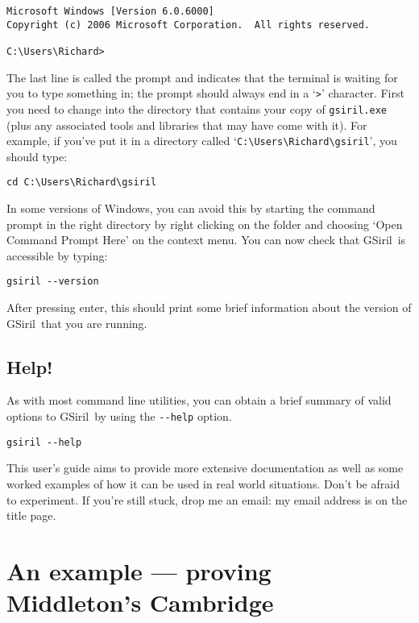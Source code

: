 \documentclass[a4paper,11pt,oneside]{book}
\makeatletter
\newcommand{\oi}[1]{\index{#1@{\hspace*{-\optwidth}\texttt{-}\texttt{#1}}}}
\newcommand{\loi}[1]{\index{#1@{\hspace*{-\loptwidth}\texttt{--#1}}}}
\newcommand{\symidx}[2]{} %
\def\gsiril{GSiril}
\makeatother
\begin{document}
\begin{Verbatim}
Microsoft Windows [Version 6.0.6000]
Copyright (c) 2006 Microsoft Corporation.  All rights reserved.

C:\Users\Richard>
\end{Verbatim}

The last line is called the prompt and indicates that the terminal is
waiting for you to type something in; the prompt should always end in a
`\verb+>+' character. %
First you need to change into the directory that contains your copy of
\texttt{gsiril.exe} (plus any associated tools and libraries that may have
come with it).  For example, if you've put it in a directory called
`\verb+C:\Users\Richard\gsiril+', you should type:

\begin{Verbatim}
cd C:\Users\Richard\gsiril
\end{Verbatim}

In some versions of Windows, you can avoid this by
starting the command prompt in the right
directory by right clicking on the folder and choosing 
`Open Command Prompt Here' on the context menu.
You can now check that \gsiril\ is accessible by typing:

\begin{Verbatim}
gsiril --version
\end{Verbatim}
\oi{V}

After pressing enter, this should print some brief information about the 
version of \gsiril\ that you are running.

\subsection{Help!}\label{help}

As with most command line utilities, you can obtain a brief summary 
of valid options to \gsiril\ by using the \verb+--help+ option.%

\begin{Verbatim}
gsiril --help
\end{Verbatim}
\loi{help}

This user's guide aims to provide more extensive documentation as 
well as some worked examples of how it can be used in real world situations.
Don't be afraid to experiment.  If you're still stuck, drop me an email:
my email address is on the title page.

\section{An example — proving Middleton's Cambridge}\label{example}
\end{document}
